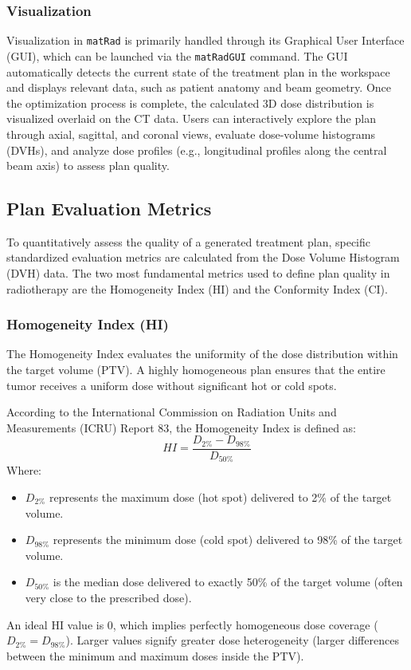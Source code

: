 \subsubsection{Visualization}
Visualization in \texttt{matRad} is primarily handled through its Graphical User Interface (GUI), which can be launched via the \texttt{matRadGUI} command. The GUI automatically detects the current state of the treatment plan in the workspace and displays relevant data, such as patient anatomy and beam geometry. Once the optimization process is complete, the calculated 3D dose distribution is visualized overlaid on the CT data. Users can interactively explore the plan through axial, sagittal, and coronal views, evaluate dose-volume histograms (DVHs), and analyze dose profiles (e.g., longitudinal profiles along the central beam axis) to assess plan quality.

\subsection{Plan Evaluation Metrics}

To quantitatively assess the quality of a generated treatment plan, specific standardized evaluation metrics are calculated from the Dose Volume Histogram (DVH) data. The two most fundamental metrics used to define plan quality in radiotherapy are the Homogeneity Index (HI) and the Conformity Index (CI).

\subsubsection{Homogeneity Index (HI)}
The Homogeneity Index evaluates the uniformity of the dose distribution within the target volume (PTV). A highly homogeneous plan ensures that the entire tumor receives a uniform dose without significant hot or cold spots. 

According to the International Commission on Radiation Units and Measurements (ICRU) Report 83, the Homogeneity Index is defined as:
\begin{equation}
    HI = \frac{D_{2\%} - D_{98\%}}{D_{50\%}}
\end{equation}
Where:
\begin{itemize}
    \item $D_{2\%}$ represents the maximum dose (hot spot) delivered to 2\% of the target volume.
    \item $D_{98\%}$ represents the minimum dose (cold spot) delivered to 98\% of the target volume.
    \item $D_{50\%}$ is the median dose delivered to exactly 50\% of the target volume (often very close to the prescribed dose).
\end{itemize}
An ideal HI value is $0$, which implies perfectly homogeneous dose coverage ($D_{2\%} = D_{98\%}$). Larger values signify greater dose heterogeneity (larger differences between the minimum and maximum doses inside the PTV).

